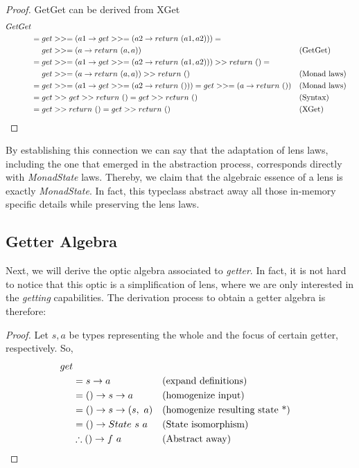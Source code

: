 \documentclass[a4paper]{article}
\begin{document}
\begin{proof}
  GetGet can be derived from XGet
  \begin{align*}
    GetGet \\
    &= get >>= (a1 \rightarrow get >>= (a2 \rightarrow return\ (a1, a2))) =\\ &\ \ \ \ get >>= (a \rightarrow return\ (a, a)) &&\text{(GetGet)} \\
    &= get >>= (a1 \rightarrow get >>= (a2 \rightarrow return\ (a1, a2))) >> return\ () =\\&\ \ \ \ get >>= (a \rightarrow return\ (a, a)) >> return\ () &&\text{(Monad laws)} \\
    &= get >>= (a1 \rightarrow get >>= (a2 \rightarrow return\ ())) = get >>= (a \rightarrow return\ ()) &&\text{(Monad laws)} \\
    &= get >> get >> return\ () = get >> return\ () &&\text{(Syntax)} \\
    &= get >> return\ () = get >> return\ () &&\text{(XGet)}\qedhere
  \end{align*}
\end{proof}

By establishing this connection we can say that the adaptation of lens laws,
including the one that emerged in the abstraction process, corresponds directly
with \emph{MonadState} laws. Thereby, we claim that the algebraic essence of a
lens is exactly \emph{MonadState}. In fact, this typeclass abstract away all
those in-memory specific details while preserving the lens laws.

\subsection{Getter Algebra}

Next, we will derive the optic algebra associated to \emph{getter}. In fact, it
is not hard to notice that this optic is a simplification of lens, where we are
only interested in the \emph{getting} capabilities. The derivation process to
obtain a getter algebra is therefore:

\begin{proof}
  Let $s, a$ be types representing the whole and the focus of certain getter,
  respectively. So,
  \begin{align*}
    get \\
    &= s \rightarrow a &&\text{(expand definitions)} \\
    &= () \rightarrow s \rightarrow a &&\text{(homogenize input)} \\
    &= () \rightarrow s \rightarrow (s,\ a) &&\text{(homogenize resulting state *)} \\
    &= () \rightarrow State\ s\ a &&\text{(State isomorphism)} \\
    &\therefore () \rightarrow f\ a &&\text{(Abstract away)}\qedhere
  \end{align*}
\end{proof}
\end{document}
